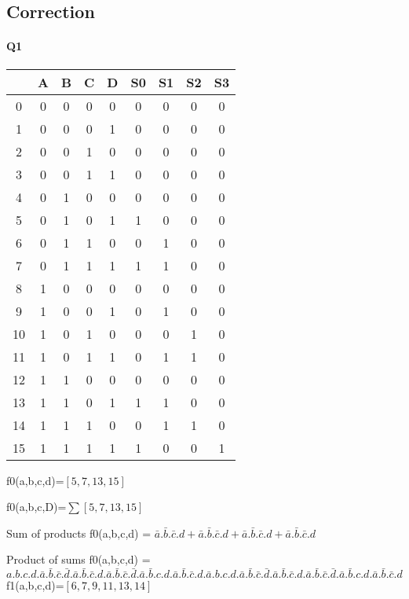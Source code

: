 \subsection{Correction}

\paragraph{Q1}

        \begin{tabular}{|c|c|c|c|c||c|c|c|c|}
    \toprule
         & A & B & C & D & S0 & S1 & S2 & S3\\ \midrule0 & 0 & 0 & 0 & 0 & 0 & 0 & 0 & 0\\1 & 0 & 0 & 0 & 1 & 0 & 0 & 0 & 0\\2 & 0 & 0 & 1 & 0 & 0 & 0 & 0 & 0\\3 & 0 & 0 & 1 & 1 & 0 & 0 & 0 & 0\\\midrule4 & 0 & 1 & 0 & 0 & 0 & 0 & 0 & 0\\5 & 0 & 1 & 0 & 1 & 1 & 0 & 0 & 0\\6 & 0 & 1 & 1 & 0 & 0 & 1 & 0 & 0\\7 & 0 & 1 & 1 & 1 & 1 & 1 & 0 & 0\\\midrule8 & 1 & 0 & 0 & 0 & 0 & 0 & 0 & 0\\9 & 1 & 0 & 0 & 1 & 0 & 1 & 0 & 0\\10 & 1 & 0 & 1 & 0 & 0 & 0 & 1 & 0\\11 & 1 & 0 & 1 & 1 & 0 & 1 & 1 & 0\\\midrule12 & 1 & 1 & 0 & 0 & 0 & 0 & 0 & 0\\13 & 1 & 1 & 0 & 1 & 1 & 1 & 0 & 0\\14 & 1 & 1 & 1 & 0 & 0 & 1 & 1 & 0\\15 & 1 & 1 & 1 & 1 & 1 & 0 & 0 & 1\\\bottomrule
        \end{tabular}
        f0(a,b,c,d)=$[5, 7, 13, 15]$

f0(a,b,c,D)=$ \sum [5, 7, 13, 15] $ 


Sum of products 
 f0(a,b,c,d) = $\bar a.\bar b.\bar c.d + \bar a.\bar b.\bar c.d + \bar a.\bar b.\bar c.d + \bar a.\bar b.\bar c.d$

Product of sums 
 f0(a,b,c,d) = $a.b.c.d.\bar a.\bar b.\bar c.\bar d.\bar a.\bar b.\bar c.d.\bar a.\bar b.\bar c.\bar d.\bar a.\bar b.c.d.\bar a.\bar b.\bar c.d.\bar a.b.c.d.\bar a.\bar b.\bar c.\bar d.\bar a.\bar b.\bar c.d.\bar a.\bar b.\bar c.\bar d.\bar a.\bar b.c.d.\bar a.\bar b.\bar c.d$
f1(a,b,c,d)=$[6, 7, 9, 11, 13, 14]$


